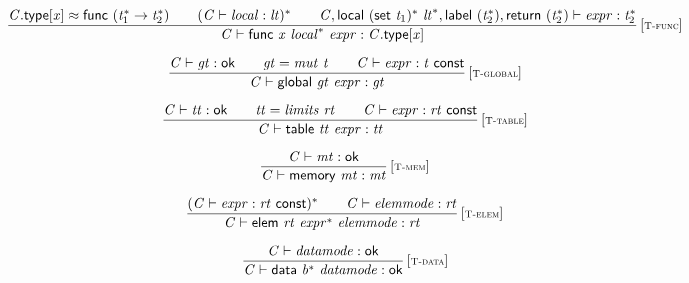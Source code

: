 $$
\begin{array}{@{}c@{}}\displaystyle
\frac{
{\mathit{C}}.\mathsf{type}[{\mathit{x}}] \approx \mathsf{func}~({{\mathit{t}}_{{1}}^\ast} \rightarrow {{\mathit{t}}_{{2}}^\ast})
 \qquad
({\mathit{C}} \vdash {\mathit{local}} : {\mathit{lt}})^\ast
 \qquad
{\mathit{C}}, \mathsf{local}~{(\mathsf{set}~{\mathit{t}}_{{1}})^\ast}~{{\mathit{lt}}^\ast}, \mathsf{label}~({{\mathit{t}}_{{2}}^\ast}), \mathsf{return}~({{\mathit{t}}_{{2}}^\ast}) \vdash {\mathit{expr}} : {{\mathit{t}}_{{2}}^\ast}
}{
{\mathit{C}} \vdash \mathsf{func}~{\mathit{x}}~{{\mathit{local}}^\ast}~{\mathit{expr}} : {\mathit{C}}.\mathsf{type}[{\mathit{x}}]
} \, {[\textsc{\scriptsize T{-}func}]}
\qquad
\end{array}
$$

$$
\begin{array}{@{}c@{}}\displaystyle
\frac{
{\mathit{C}} \vdash {\mathit{gt}} : \mathsf{ok}
 \qquad
{\mathit{gt}} = {\mathit{mut}}~{\mathit{t}}
 \qquad
{\mathit{C}} \vdash {\mathit{expr}} : {\mathit{t}}~\mathsf{const}
}{
{\mathit{C}} \vdash \mathsf{global}~{\mathit{gt}}~{\mathit{expr}} : {\mathit{gt}}
} \, {[\textsc{\scriptsize T{-}global}]}
\qquad
\end{array}
$$

$$
\begin{array}{@{}c@{}}\displaystyle
\frac{
{\mathit{C}} \vdash {\mathit{tt}} : \mathsf{ok}
 \qquad
{\mathit{tt}} = {\mathit{limits}}~{\mathit{rt}}
 \qquad
{\mathit{C}} \vdash {\mathit{expr}} : {\mathit{rt}}~\mathsf{const}
}{
{\mathit{C}} \vdash \mathsf{table}~{\mathit{tt}}~{\mathit{expr}} : {\mathit{tt}}
} \, {[\textsc{\scriptsize T{-}table}]}
\qquad
\end{array}
$$

$$
\begin{array}{@{}c@{}}\displaystyle
\frac{
{\mathit{C}} \vdash {\mathit{mt}} : \mathsf{ok}
}{
{\mathit{C}} \vdash \mathsf{memory}~{\mathit{mt}} : {\mathit{mt}}
} \, {[\textsc{\scriptsize T{-}mem}]}
\qquad
\end{array}
$$

$$
\begin{array}{@{}c@{}}\displaystyle
\frac{
({\mathit{C}} \vdash {\mathit{expr}} : {\mathit{rt}}~\mathsf{const})^\ast
 \qquad
{\mathit{C}} \vdash {\mathit{elemmode}} : {\mathit{rt}}
}{
{\mathit{C}} \vdash \mathsf{elem}~{\mathit{rt}}~{{\mathit{expr}}^\ast}~{\mathit{elemmode}} : {\mathit{rt}}
} \, {[\textsc{\scriptsize T{-}elem}]}
\qquad
\end{array}
$$

$$
\begin{array}{@{}c@{}}\displaystyle
\frac{
{\mathit{C}} \vdash {\mathit{datamode}} : \mathsf{ok}
}{
{\mathit{C}} \vdash \mathsf{data}~{{\mathit{b}}^\ast}~{\mathit{datamode}} : \mathsf{ok}
} \, {[\textsc{\scriptsize T{-}data}]}
\qquad
\end{array}
$$

